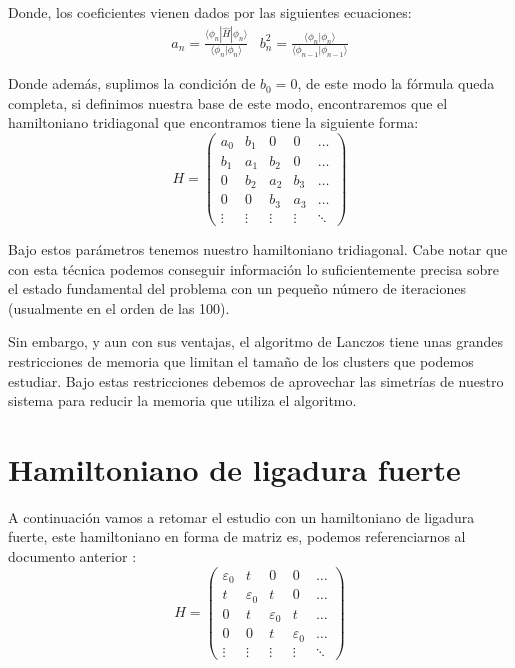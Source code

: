 \documentclass{article} %
\begin{document}
Donde, los coeficientes vienen dados por las siguientes ecuaciones:
\begin{equation}
    \begin{array}{cc}
        a_n = \frac{\langle\phi_n|\hat{H}|\phi_n\rangle}{\langle\phi_n|\phi_n\rangle} & b_n^2 = \frac{\langle\phi_n|\phi_n\rangle}{\langle\phi_{n-1}|\phi_{n-1}\rangle}
    \end{array}
\end{equation}

Donde además, suplimos la condición de $b_0 = 0$, de este modo la fórmula queda completa, si definimos nuestra base de este modo, encontraremos que el hamiltoniano tridiagonal que encontramos tiene la siguiente forma:
\begin{equation}
    H = \left(\begin{array}{ccccc}
        a_0 & b_1 & 0 & 0 & \ldots \\
        b_1 & a_1 & b_2 & 0 & \ldots \\
        0 & b_2 & a_2 & b_3 & \ldots \\
        0 & 0 & b_3 & a_3 & \ldots \\
        \vdots & \vdots & \vdots & \vdots & \ddots
    \end{array}\right)
\end{equation}

Bajo estos parámetros tenemos nuestro hamiltoniano tridiagonal. Cabe notar que con esta técnica podemos conseguir información lo suficientemente precisa sobre el estado fundamental del problema con un pequeño número de iteraciones (usualmente en el orden de las 100).

Sin embargo, y aun con sus ventajas, el algoritmo de Lanczos tiene unas grandes restricciones de memoria que limitan el tamaño de los clusters que podemos estudiar. Bajo estas restricciones debemos de aprovechar las simetrías de nuestro sistema para reducir la memoria que utiliza el algoritmo.
\section{Hamiltoniano de ligadura fuerte}
A continuación vamos a retomar el estudio con un hamiltoniano de ligadura fuerte, este hamiltoniano en forma de matriz es, podemos referenciarnos al documento anterior \cite{TBSQ}:
\begin{equation}
    H = \left(\begin{array}{ccccc}
        \varepsilon_0 & t & 0 & 0 & \ldots \\
        t & \varepsilon_0 & t & 0 & \ldots \\
        0 & t & \varepsilon_0 & t & \ldots \\
        0 & 0 & t & \varepsilon_0 & \ldots \\
        \vdots & \vdots & \vdots & \vdots & \ddots
    \end{array}\right)
\end{equation}
\end{document}
